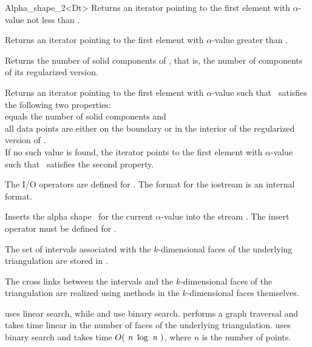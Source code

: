 \begin{ccRefClass} {Alpha_shape_2<Dt>}
{Returns an iterator pointing to the first element with
$\alpha$-value not less than .}

{Returns an iterator pointing to the first element with $\alpha$-value
greater than .}


{Returns the number of solid components of \ccVar, that is, the number of
components of its 
regularized version.}

{Returns an iterator pointing to the first element with $\alpha$-value
such that \ccVar\ satisfies the following two properties:\\
 equals the number of solid components and \\
all data points are either on the boundary or in the interior of the regularized version of \ccVar.\\
If no such value is found, the iterator points to the first element with 
$\alpha$-value such that \ccVar\ satisfies the second property.}


The I/O operators are defined for . The format for the iostream
is an internal format. 


{Inserts the alpha shape \ccVar\ for the current $\alpha$-value into the stream .
\ccPrecond The insert operator must be defined for .}


\ccImplementation
The set of intervals associated with the
$k$-dimensional faces of the underlying triangulation are
stored in .

The cross links between the intervals and the $k$-dimensional faces of the
triangulation are realized using methods in the $k$-dimensional faces
themselves.

 uses linear search, while 
 and  
use binary search.
 performs a graph traversal and takes time
linear in the number of faces of the underlying triangulation.
 uses binary search and takes time
$O(\mbox{ \em n } \log{\mbox{ \em n } })$, where  $n$ is the number of points.

\end{ccRefClass}

